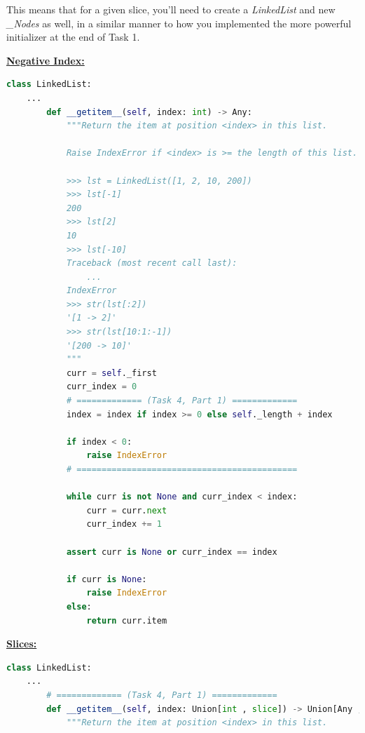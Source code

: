 \documentclass[12pt]{article}
\begin{document}
\bigskip

\noindent This means that for a given slice, you’ll need to create a \textit{LinkedList} and new
\textit{\_Nodes} as well, in a similar manner to how you implemented the more
powerful initializer at the end of Task 1.

\bigskip

\begin{mdframed}

\underline{\textbf{Negative Index:}}

\begin{lstlisting}[language=python,caption={task\_4\_part\_1\_solution.py}]
    class LinkedList:
    ...
        def __getitem__(self, index: int) -> Any:
            """Return the item at position <index> in this list.

            Raise IndexError if <index> is >= the length of this list.

            >>> lst = LinkedList([1, 2, 10, 200])
            >>> lst[-1]
            200
            >>> lst[2]
            10
            >>> lst[-10]
            Traceback (most recent call last):
                ...
            IndexError
            >>> str(lst[:2])
            '[1 -> 2]'
            >>> str(lst[10:1:-1])
            '[200 -> 10]'
            """
            curr = self._first
            curr_index = 0
            # ============= (Task 4, Part 1) =============
            index = index if index >= 0 else self._length + index

            if index < 0:
                raise IndexError
            # ============================================

            while curr is not None and curr_index < index:
                curr = curr.next
                curr_index += 1

            assert curr is None or curr_index == index

            if curr is None:
                raise IndexError
            else:
                return curr.item

\end{lstlisting}

\bigskip

\underline{\textbf{Slices:}}

\bigskip

\begin{lstlisting}[language=python,caption={task\_4\_part\_1\_solution.py}]
    class LinkedList:
    ...
        # ============= (Task 4, Part 1) =============
        def __getitem__(self, index: Union[int , slice]) -> Union[Any , LinkedList]:
            """Return the item at position <index> in this list.


\end{lstlisting}
\end{mdframed}
\end{document}
